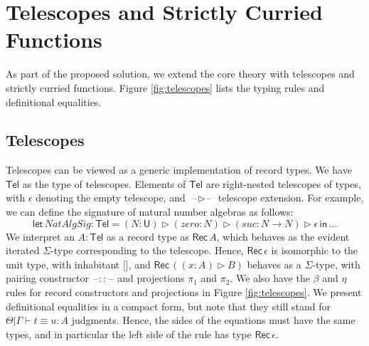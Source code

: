 \documentclass[acmsmall,screen,dvipsnames]{acmart}\settopmatter{}
\newcommand{\slet}{\boldsymbol{\mathsf{let}}}
\renewcommand{\sin}{\boldsymbol{\mathsf{in}}}
\renewcommand{\U}{\mathsf{U}}
\newcommand{\blank}{\mathord{\hspace{1pt}\text{--}\hspace{1pt}}}
\newcommand{\Tel}{\mathsf{Tel}}
\newcommand{\TCons}{\triangleright}
\newcommand{\Rec}{\mathsf{Rec}}
\theoremstyle{remark}
\begin{document}
\section{Telescopes and Strictly Curried Functions}

As part of the proposed solution, we extend the core theory with telescopes and
strictly curried functions. Figure \ref{fig:telescopes} lists the typing rules and
definitional equalities.

\subsection{Telescopes}
Telescopes can be viewed as a generic implementation of record types. We have
$\Tel$ as the type of telescopes. Elements of $\Tel$ are right-nested telescopes
of types, with $\epsilon$ denoting the empty telescope, and $\blank\TCons\blank$
telescope extension. For example, we can define the signature of natural number
algebras as follows:
\[
  \slet\,NatAlgSig : \Tel = (N : \U) \TCons (zero : N) \TCons (suc : N \to N) \TCons \epsilon\,\sin\,...
\]
We interpret an $A : \Tel$ as a record type as $\Rec\,A$, which behaves as the
evident iterated $\Sigma$-type corresponding to the telescope. Hence,
$\Rec\,\epsilon$ is isomorphic to the unit type, with inhabitant ${[}{]}$, and
$\Rec\,((x : A) \TCons B)$ behaves as a $\Sigma$-type, with pairing constructor
$\blank::\blank$ and projections $\pi_1$ and $\pi_2$. We also have the $\beta$
and $\eta$ rules for record constructors and projections in Figure
\ref{fig:telescopes}. We present definitional equalities in a compact form, but
note that they still stand for $\boxed{\Theta|\Gamma\vdash t \equiv u : A}$
judgments. Hence, the sides of the equations must have the same types, and in
particular the left side of the \LabTirName{${[}{]}$-$\eta$} rule has type
$\Rec\,\epsilon$.
\end{document}
